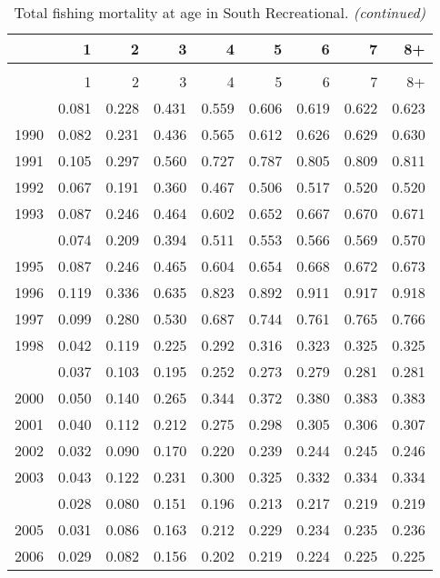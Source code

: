 \documentclass[
]{article}
\begin{document}
\begin{longtable}[t]{lrrrrrrrr}
\caption{\label{tab:South_Recreational-fleet-FAA-table}Total fishing mortality at age in South Recreational.}\\
\toprule
  & 1 & 2 & 3 & 4 & 5 & 6 & 7 & 8+\\
\midrule
\endfirsthead
\caption[]{Total fishing mortality at age in South Recreational. \textit{(continued)}}\\
\toprule
  & 1 & 2 & 3 & 4 & 5 & 6 & 7 & 8+\\
\midrule
\endhead

\endfoot
\bottomrule
\endlastfoot
1989 & 0.081 & 0.228 & 0.431 & 0.559 & 0.606 & 0.619 & 0.622 & 0.623\\
1990 & 0.082 & 0.231 & 0.436 & 0.565 & 0.612 & 0.626 & 0.629 & 0.630\\
1991 & 0.105 & 0.297 & 0.560 & 0.727 & 0.787 & 0.805 & 0.809 & 0.811\\
1992 & 0.067 & 0.191 & 0.360 & 0.467 & 0.506 & 0.517 & 0.520 & 0.520\\
1993 & 0.087 & 0.246 & 0.464 & 0.602 & 0.652 & 0.667 & 0.670 & 0.671\\
\addlinespace
1994 & 0.074 & 0.209 & 0.394 & 0.511 & 0.553 & 0.566 & 0.569 & 0.570\\
1995 & 0.087 & 0.246 & 0.465 & 0.604 & 0.654 & 0.668 & 0.672 & 0.673\\
1996 & 0.119 & 0.336 & 0.635 & 0.823 & 0.892 & 0.911 & 0.917 & 0.918\\
1997 & 0.099 & 0.280 & 0.530 & 0.687 & 0.744 & 0.761 & 0.765 & 0.766\\
1998 & 0.042 & 0.119 & 0.225 & 0.292 & 0.316 & 0.323 & 0.325 & 0.325\\
\addlinespace
1999 & 0.037 & 0.103 & 0.195 & 0.252 & 0.273 & 0.279 & 0.281 & 0.281\\
2000 & 0.050 & 0.140 & 0.265 & 0.344 & 0.372 & 0.380 & 0.383 & 0.383\\
2001 & 0.040 & 0.112 & 0.212 & 0.275 & 0.298 & 0.305 & 0.306 & 0.307\\
2002 & 0.032 & 0.090 & 0.170 & 0.220 & 0.239 & 0.244 & 0.245 & 0.246\\
2003 & 0.043 & 0.122 & 0.231 & 0.300 & 0.325 & 0.332 & 0.334 & 0.334\\
\addlinespace
2004 & 0.028 & 0.080 & 0.151 & 0.196 & 0.213 & 0.217 & 0.219 & 0.219\\
2005 & 0.031 & 0.086 & 0.163 & 0.212 & 0.229 & 0.234 & 0.235 & 0.236\\
2006 & 0.029 & 0.082 & 0.156 & 0.202 & 0.219 & 0.224 & 0.225 & 0.225\\

\end{longtable}
\end{document}
